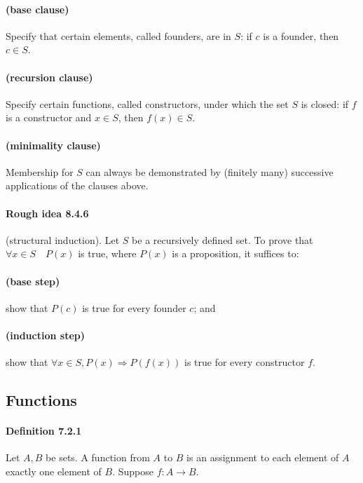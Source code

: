 \documentclass[a4paper]{article}
\begin{document}
\begin{multicols*}{3}
      \paragraph{(base clause)} Specify that certain elements, called founders, are in $S$: if $c$ is a founder, then $c \in S$.
      \paragraph{(recursion clause)} Specify certain functions, called constructors, under which the set $S$ is closed: if $f$ is a constructor and $x \in S$, then $f(x) \in S$.
      \paragraph{(minimality clause)} Membership for $S$ can always be demonstrated by (finitely many) successive applications of the clauses above.
    \paragraph{Rough idea 8.4.6} (structural induction). Let $S$ be a recursively defined set. To prove that $\forall x \in S \quad P(x)$ is true, where $P(x)$ is a proposition, it suffices to:
      \paragraph{(base step)} show that $P(c)$ is true for every founder $c$; and
      \paragraph{(induction step)} show that $\forall x\in S, P(x) \Rightarrow P(f(x))$ is true for every constructor $f$.
  \subsection*{Functions}
    \paragraph{Definition 7.2.1} Let $A,B$ be sets. A function from $A$ to $B$ is an assignment to each element of $A$ exactly one element of $B$. Suppose $f: A \rightarrow B$.

\end{multicols*}
\end{document}
